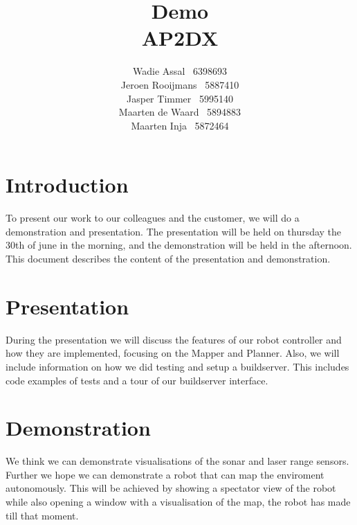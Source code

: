 \documentclass[a4paper,10pt]{article}
\title{Demo\\AP2DX}
\author{Wadie Assal \ 6398693 \\ Jeroen Rooijmans \ 5887410 \\ Jasper Timmer \ 5995140 \\
Maarten de Waard \ 5894883 \\ Maarten Inja \ 5872464}
\begin{document}
\maketitle
\newpage

\section{Introduction}
To present our work to our colleagues and the customer, we will do a demonstration and presentation. The presentation will be held on thursday the 30th of june in the morning, and the demonstration will be held in the afternoon. This document describes the content of the presentation and demonstration.

\section{Presentation}
During the presentation we will discuss the features of our robot controller and how they are implemented, focusing on the Mapper and Planner. Also, we will include information on how we did testing and setup a buildserver. This includes code examples of tests and a tour of our buildserver interface.

\section{Demonstration}
We think we can demonstrate visualisations of the sonar and laser range sensors. Further we hope we can demonstrate a robot that can map the enviroment autonomously. This will be achieved by showing a spectator view of the robot while also opening a window with a visualisation of the map, the robot has made till that moment.
\end{document}
